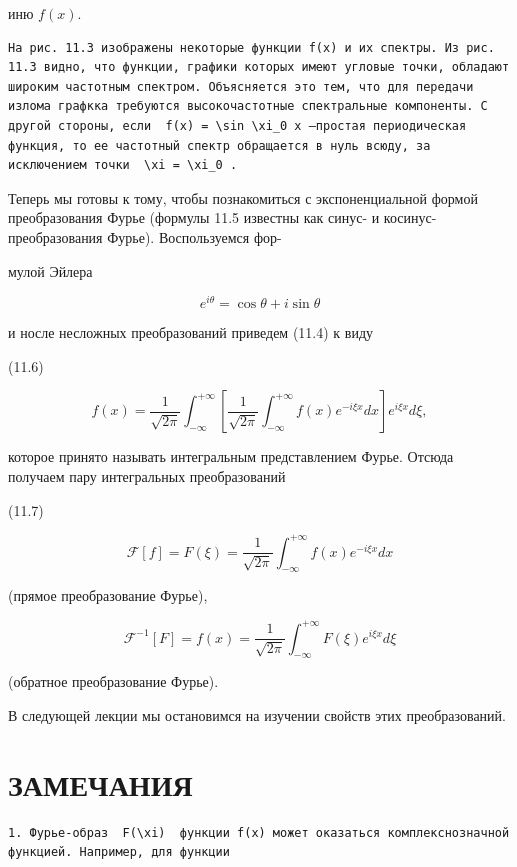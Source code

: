 \documentclass[
  ukrainian,
]{article}
\begin{document}
иню \(f(x)\).

\begin{verbatim}
На рис. 11.3 изображены некоторые функции f(x) и их спектры. Из рис. 11.3 видно, что функции, графики которых имеют угловые точки, обладают широким частотным спектром. Объясняется это тем, что для передачи излома графкка требуются высокочастотные спектральные компоненты. С другой стороны, если  f(x) = \sin \xi_0 x —простая периодическая функция, то ее частотный спектр обращается в нуль всюду, за исключением точки  \xi = \xi_0 .
\end{verbatim}

Теперь мы готовы к тому, чтобы познакомиться с экспоненциальной формой
преобразования Фурье (формулы 11.5 известны как синус- и
косинус-преобразования Фурье). Воспользуемся фор-

мулой Эйлера

\[
e^{i\theta} = \cos \theta + i \sin \theta
\]

и носле несложных преобразований приведем (11.4) к виду

(11.6)

\[
f(x) = \frac{1}{\sqrt{2\pi}} \int_{-\infty}^{+\infty} \left[ \frac{1}{\sqrt{2\pi}} \int_{-\infty}^{+\infty} f(x) e^{-i\xi x} dx \right] e^{i\xi x} d\xi,
\]

которое принято называть интегральным представлением Фурье. Отсюда
получаем пару интегральных преобразований

(11.7)

\[
\mathcal{F}[f] = F(\xi) = \frac{1}{\sqrt{2\pi}} \int_{-\infty}^{+\infty} f(x) e^{-i\xi x} dx
\]

(прямое преобразование Фурье),

\[
\mathcal{F}^{-1}[F] = f(x) = \frac{1}{\sqrt{2\pi}} \int_{-\infty}^{+\infty} F(\xi) e^{i\xi x} d\xi
\]

(обратное преобразование Фурье).

В следующей лекции мы остановимся на изучении свойств этих
преобразований.

\section{ЗАМЕЧАНИЯ}\label{ux437ux430ux43cux435ux447ux430ux43dux438ux44f}

\begin{verbatim}
1. Фурье-образ  F(\xi)  функции f(x) может оказаться комплекснозначной функцией. Например, для функции
\end{verbatim}
\end{document}
